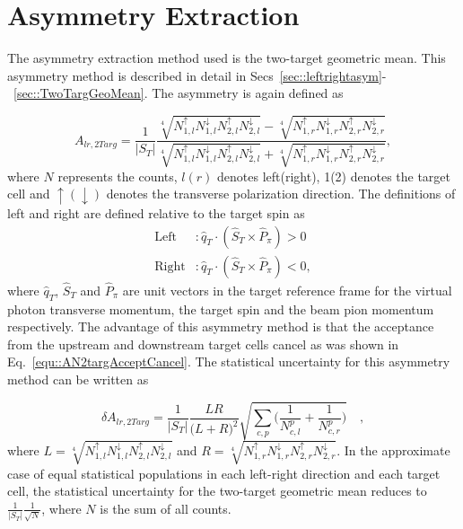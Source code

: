 \section{Asymmetry Extraction}
The asymmetry extraction method used is the two-target geometric mean.  This
asymmetry method is described in detail in
Secs~\ref{sec::leftrightasym}-~\ref{sec::TwoTargGeoMean}.  The asymmetry is
again defined as

\begin{equation}
  \label{equ::AN4TargGeomeanJPsi}
  A_{lr,2Targ} =
  \frac{1}{|S_T|}
  \frac{ \sqrt[4]{ N_{1,l}^\uparrow N_{1, l}^\downarrow
      N_{2,l}^\uparrow N_{2, l}^\downarrow }
    - \sqrt[4]{ N_{1,r}^\uparrow N_{1,r}^\downarrow
      N_{2,r}^\uparrow N_{2,r}^\downarrow }
  }{
    \sqrt[4]{ N_{1,l}^\uparrow N_{1, l}^\downarrow
      N_{2,l}^\uparrow N_{2, l}^\downarrow }
    + \sqrt[4]{ N_{1,r}^\uparrow N_{1,r}^\downarrow
      N_{2,r}^\uparrow N_{2,r}^\downarrow } },
\end{equation}
\noindent
where $N$ represents the counts, $l(r)$ denotes left(right), 1(2) denotes the
target cell and $\uparrow(\downarrow)$ denotes the transverse polarization
direction.  The definitions of left and right are defined relative to the target
spin as
\begin{equation}
  \begin{aligned}
    \text{Left} &: \hat{q}_T \cdot (\hat{S}_T \times \hat{P}_{\pi}) > 0 \\
    \text{Right} &: \hat{q}_T \cdot (\hat{S}_T \times \hat{P}_{\pi}) < 0, 
  \end{aligned}
\end{equation}
\noindent
where $\hat{q}_T$, $\hat{S}_T$ and $\hat{P}_{\pi}$ are unit vectors in the
target reference frame for the virtual photon transverse momentum, the target
spin and the beam pion momentum respectively.  The advantage of this asymmetry
method is that the acceptance from the upstream and downstream target cells
cancel as was shown in Eq.~\ref{equ::AN2targAcceptCancel}.  The statistical
uncertainty for this asymmetry method can be written as

\begin{equation}
  \delta A_{lr,2Targ} = \frac{1}{|S_T|}
  \frac{LR}{\Big( L+R \Big)^2}
  \sqrt{
    \sum_{c,p}
    \Big(
    \frac{1}{N_{c,l}^{p}}
    + \frac{1}{N_{c,r}^p}
    \Big)
  } \quad,
\end{equation}
where $L =\sqrt[4]{N_{1,l}^\uparrow N_{1,l}^\downarrow N_{2,l}^\uparrow
  N_{2,l}^\downarrow}$ and $R =\sqrt[4]{N_{1,r}^\uparrow N_{1,r}^\downarrow
  N_{2,r}^\uparrow N_{2,r}^\downarrow}$.  In the approximate case of equal
statistical populations in each left-right direction and each target cell, the
statistical uncertainty for the two-target geometric mean reduces to
$\frac{1}{|S_T|}\frac{1}{\sqrt{N}}$, where $N$ is the sum of all counts.

